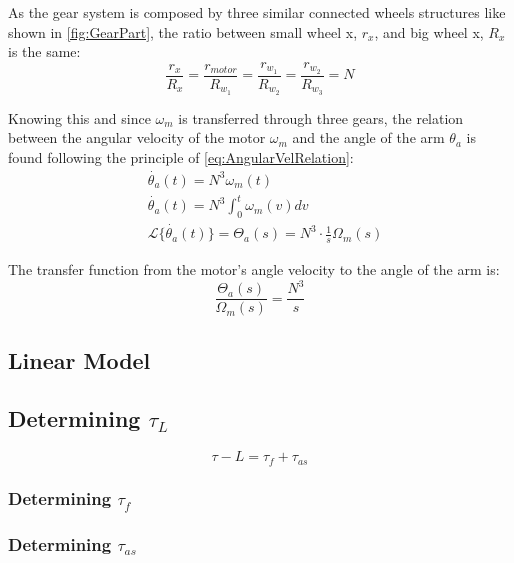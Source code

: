 As the gear system is composed by three similar connected wheels structures like shown in \autoref{fig:GearPart}, the ratio between small wheel x, $r_x$, and big wheel x, $R_x$ is the same:
\begin{equation}
	\frac{r_x}{R_x} = \frac{r_{motor}}{R_{w_1}} = \frac{r_{w_1}}{R_{w_2}} = \frac{r_{w_2}}{R_{w_3}} = N
\end{equation}

Knowing this and since $\omega_m$ is transferred through three gears, the relation between the angular velocity of the motor $\omega_m$ and the angle of the arm $\theta_a$ is found following the principle of \autoref{eq:AngularVelRelation}:
\begin{subequations} \label{eq:tech_ToA}
	\begin{flalign}
		&\dot{\theta_a}(t) = N^3 \omega_m(t) \\
		&\dot{\theta_a}(t) = N^3 \int_{0}^{t}\omega_m(v) dv \\
		&\mathscr{L}\{\dot{\theta_a}(t)\} = \Theta_a(s) = N^3 \cdot \frac{1}{s} \Omega_m(s)
	\end{flalign}
\end{subequations}

The transfer function from the motor's angle velocity to the angle of the arm is:
\begin{equation}
	\frac{\Theta_a(s)}{\Omega_m(s)} =  \frac{N^3}{s}
\end{equation}

\subsection{Linear Model}

\subsection{Determining $\tau_L$}

\begin{equation}
	\tau-L = \tau_f + \tau_{as}
\end{equation}

\subsubsection*{Determining $\tau_{f}$}

\subsubsection*{Determining $\tau_{as}$}


